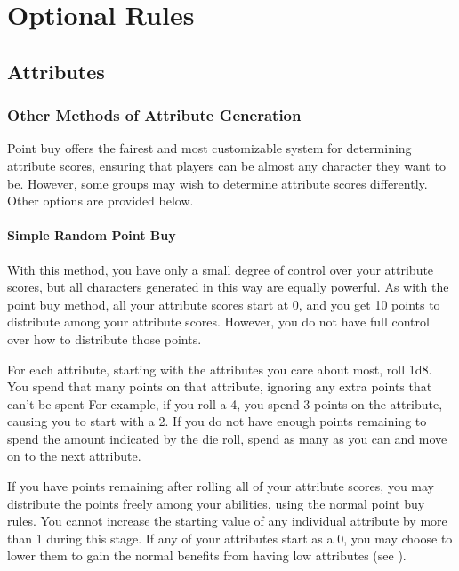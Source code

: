 \chapter{Optional Rules}

\section{Attributes}

    \subsection{Other Methods of Attribute Generation}
        Point buy offers the fairest and most customizable system for determining attribute scores, ensuring that players can be almost any character they want to be. However, some groups may wish to determine attribute scores differently. Other options are provided below.

        \subsubsection{Simple Random Point Buy}
            With this method, you have only a small degree of control over your attribute scores, but all characters generated in this way are equally powerful.
            As with the point buy method, all your attribute scores start at 0, and you get 10 points to distribute among your attribute scores.
            However, you do not have full control over how to distribute those points.

            For each attribute, starting with the attributes you care about most, roll 1d8.
            You spend that many points on that attribute, ignoring any extra points that can't be spent
            For example, if you roll a 4, you spend 3 points on the attribute, causing you to start with a 2.
            If you do not have enough points remaining to spend the amount indicated by the die roll, spend as many as you can and move on to the next attribute.

            If you have points remaining after rolling all of your attribute scores, you may distribute the points freely among your abilities, using the normal point buy rules.
            You cannot increase the starting value of any individual attribute by more than 1 during this stage.
            If any of your attributes start as a 0, you may choose to lower them to gain the normal benefits from having low attributes (see ).


